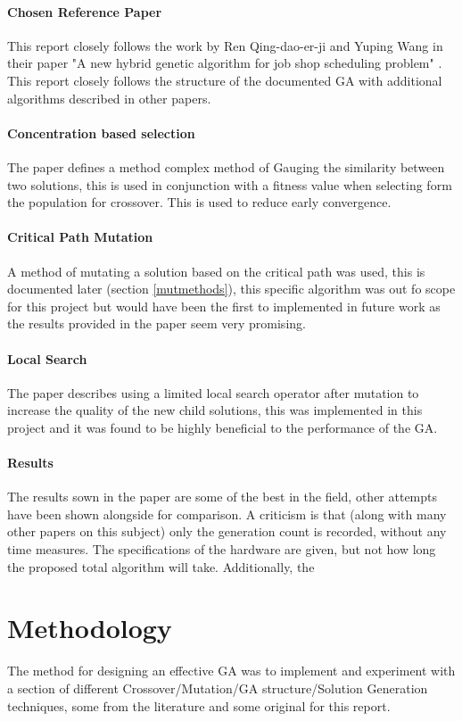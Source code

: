 \documentclass[14pt]{acmsiggraph}
\begin{document}
\paragraph{Chosen Reference Paper}
This report closely follows the work by Ren Qing-dao-er-ji and Yuping Wang in their paper "A new hybrid genetic algorithm for job shop scheduling problem" \cite{wang2012new}. This report closely follows the structure of the documented GA with additional algorithms described in other papers.

\paragraph{Concentration based selection}
The paper defines a method complex method of Gauging the similarity between two solutions, this is used in conjunction with a fitness value when selecting form the population for crossover. This is used to reduce early convergence. 

\paragraph{Critical Path Mutation}
A method of mutating a solution based on the critical path was used, this is documented later (section \ref{mutmethods}), this specific algorithm was out fo scope for this project but would have been the first to implemented in future work as the results provided in the paper seem very promising.

\paragraph{Local Search}
The paper describes using a limited local search operator after mutation to increase the quality of the new child solutions, this was implemented in this project and it was found to be highly beneficial to the performance of the GA.

\paragraph{Results}
The results sown in the paper are some of the best in the field, other attempts have been shown alongside for  comparison.
A criticism is that (along with many other papers on this subject) only the generation count is recorded, without any time measures. The specifications of the hardware are given, but not how long the proposed total algorithm will take. Additionally, the 

\section{Methodology}
The method for designing an effective GA was to implement and experiment with a section of different Crossover/Mutation/GA structure/Solution Generation techniques, some from the literature and some original for this report.
\end{document}
